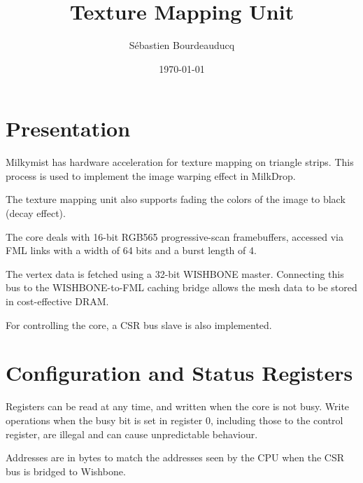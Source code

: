 \documentclass[a4paper,11pt]{article}
\title{Texture Mapping Unit}
\author{S\'ebastien Bourdeauducq}
\date{\today}
\begin{document}
\maketitle{}

\section{Presentation}
Milkymist has hardware acceleration for texture mapping on triangle strips. This process is used to implement the image warping effect in MilkDrop.

The texture mapping unit also supports fading the colors of the image to black (decay effect).

The core deals with 16-bit RGB565 progressive-scan framebuffers, accessed via FML links with a width of 64 bits and a burst length of 4.

The vertex data is fetched using a 32-bit WISHBONE master. Connecting this bus to the WISHBONE-to-FML caching bridge allows the mesh data to be stored in cost-effective DRAM.

For controlling the core, a CSR bus slave is also implemented.

\section{Configuration and Status Registers}
Registers can be read at any time, and written when the core is not busy. Write operations when the busy bit is set in register 0, including those to the control register, are illegal and can cause unpredictable behaviour.

Addresses are in bytes to match the addresses seen by the CPU when the CSR bus is bridged to Wishbone.
\end{document}
